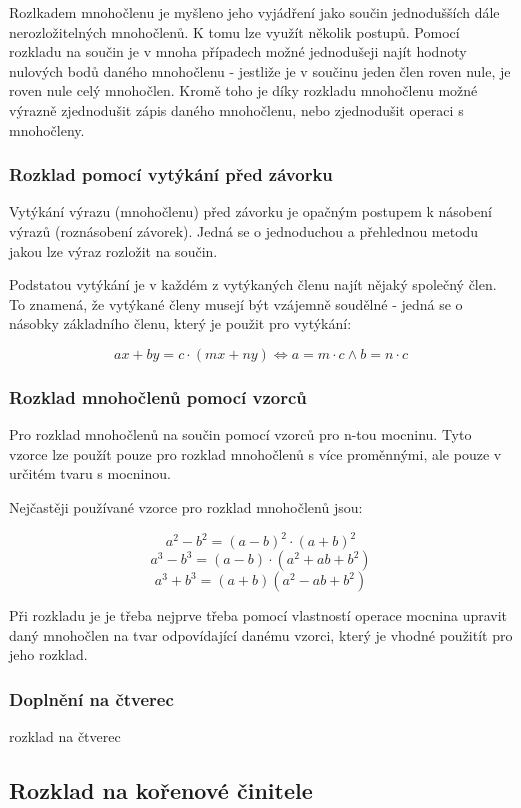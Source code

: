 \documentclass[11pt]{article}
\begin{document}
Rozlkadem mnohočlenu je myšleno jeho vyjádření jako součin jednodušších dále nerozložitelných mnohočlenů. K tomu lze využít několik postupů. Pomocí rozkladu na součin je v mnoha případech možné jednodušeji najít hodnoty nulových bodů daného mnohočlenu - jestliže je v součinu jeden člen roven nule, je roven nule celý mnohočlen. Kromě toho je díky rozkladu mnohočlenu možné výrazně zjednodušit zápis daného mnohočlenu, nebo zjednodušit operaci s mnohočleny.

\subsubsection{Rozklad pomocí vytýkání před závorku}

Vytýkání výrazu (mnohočlenu) před závorku je opačným postupem k násobení výrazů (roznásobení závorek). Jedná se o jednoduchou a přehlednou metodu jakou lze výraz rozložit na součin. 

Podstatou vytýkání je v každém z vytýkaných členu najít nějaký společný člen. To znamená, že vytýkané členy musejí být vzájemně soudělné - jedná se o násobky základního členu, který je použit pro vytýkání:

$$ ax + by = c\cdot (mx + ny) \Leftrightarrow a = m\cdot c \wedge b = n\cdot c $$

\subsubsection{Rozklad mnohočlenů pomocí vzorců}

Pro rozklad mnohočlenů na součin pomocí vzorců pro n-tou mocninu. Tyto vzorce lze použít pouze pro rozklad mnohočlenů s více proměnnými, ale pouze v určitém tvaru s mocninou.

Nejčastěji používané vzorce pro rozklad mnohočlenů jsou:

$$ a^2 -b^2 = (a-b)^2 \cdot (a+b)^2 $$
$$ a^3 - b^3 = (a-b) \cdot (a^2 + ab +b^2) $$
$$ a^3 + b^3 =(a+b)(a^2-ab+b^2) $$


Při rozkladu je je třeba nejprve třeba pomocí vlastností operace mocnina upravit daný mnohočlen na tvar odpovídající danému vzorci, který je vhodné použitít pro jeho rozklad.

\subsubsection{Doplnění na čtverec}
rozklad na čtverec


\subsection{Rozklad na kořenové činitele}
\end{document}
